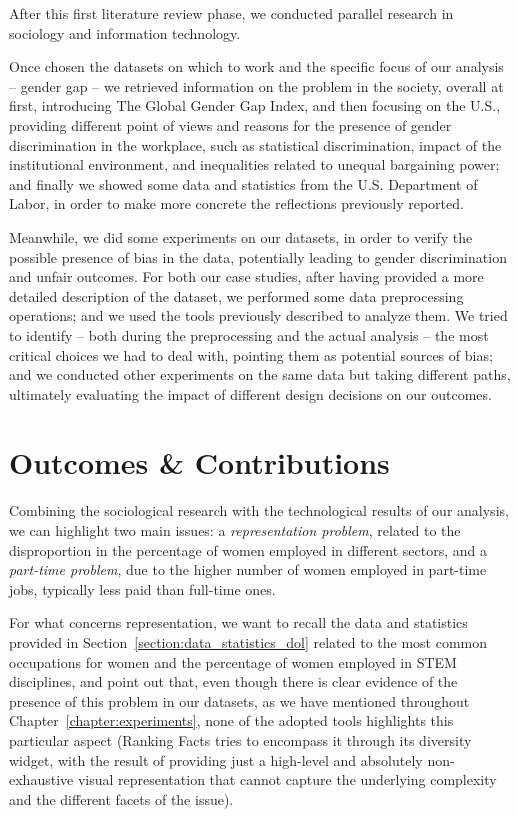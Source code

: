 After this first literature review phase, we conducted parallel research in sociology and information technology.

Once chosen the datasets on which to work and the specific focus of our analysis -- gender gap -- we retrieved information on the problem in the society, overall at first, introducing The Global Gender Gap Index, and then focusing on the U.S., providing different point of views and reasons for the presence of gender discrimination in the workplace, such as statistical discrimination, impact of the institutional environment, and inequalities related to unequal bargaining power; and finally we showed some data and statistics from the U.S. Department of Labor, in order to make more concrete the reflections previously reported.

Meanwhile, we did some experiments on our datasets, in order to verify the possible presence of bias in the data, potentially leading to gender discrimination and unfair outcomes. For both our case studies, after having provided a more detailed description of the dataset, we performed some data preprocessing operations; and we used the tools previously described to analyze them. We tried to identify -- both during the preprocessing and the actual analysis -- the most critical choices we had to deal with, pointing them as potential sources of bias; and we conducted other experiments on the same data but taking different paths, ultimately evaluating the impact of different design decisions on our outcomes.


\section{Outcomes \& Contributions}
Combining the sociological research with the technological results of our analysis, we can highlight two main issues: a \textit{representation problem}, related to the disproportion in the percentage of women employed in different sectors, and a \textit{part-time problem}, due to the higher number of women employed in part-time jobs, typically less paid than full-time ones.

For what concerns representation, we want to recall the data and statistics provided in Section~\ref{section:data_statistics_dol} related to the most common occupations for women and the percentage of women employed in STEM disciplines, and point out that, even though there is clear evidence of the presence of this problem in our datasets, as we have mentioned throughout Chapter~\ref{chapter:experiments}, none of the adopted tools highlights this particular aspect (Ranking Facts tries to encompass it through its diversity widget, with the result of providing just a high-level and absolutely non-exhaustive visual representation that cannot capture the underlying complexity and the different facets of the issue).

